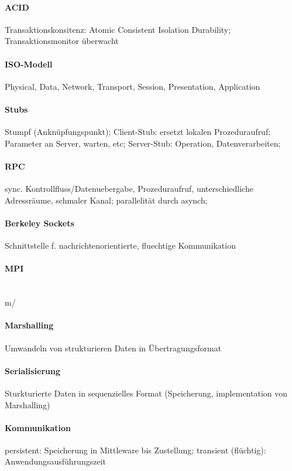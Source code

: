 \documentclass[pagesize,11pt,a4paper]{scrartcl}
\begin{document}
\paragraph*{ACID}
	Transaktionskonsitenz:
		Atomic Consistent Isolation Durability;
	Transaktionsmonitor überwacht

\paragraph*{ISO-Modell}
	Physical, Data, Network, Transport, Session, Presentation, Application
	
\paragraph*{Stubs}
	Stumpf (Anknüpfungspunkt);
	Client-Stub: ersetzt lokalen Prozeduraufruf;
	Parameter an Server, warten, etc;
	Server-Stub: Operation, Datenverarbeiten;

\paragraph*{RPC}
	sync. Kontrollfluss/Datenuebergabe, Prozeduraufruf, unterschiedliche Adressräume, schmaler Kanal;
	parallelität durch asynch;
	
\paragraph*{Berkeley Sockets}
	Schnittstelle f. nachrichtenorientierte, fluechtige Kommunikation

\paragraph*{MPI}
	\\m/

\paragraph*{Marshalling}
	Umwandeln von strukturieren Daten in Übertragungsformat
	
\paragraph*{Serialisierung}
	Sturkturierte Daten in sequenzielles Format (Speicherung, implementation von Marshalling)
	
\paragraph*{Kommunikation}
	persistent: Speicherung in Mittleware bis Zustellung;
	transient (flüchtig): Anwendungsausführungszeit
\end{document}
